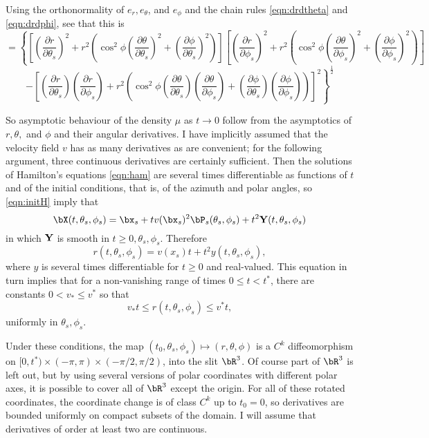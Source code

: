 Using the orthonormality of $e_r, e_{\theta}$, and $e_{\phi}$ and
the chain rules \ref{eqn:drdtheta} and \ref{eqn:drdphi}, see that this is
\[
= \left\{
\left[
\left(\frac{\partial r}{\partial \theta_s}\right)^2 
+
r^2\left(\cos^2 \phi\left(\frac{\partial \theta}{\partial \theta_s}\right)^2 
+
\left(\frac{\partial \phi}{\partial \theta_s}\right)^2\right)\right]
\left[
\left(\frac{\partial r}{\partial \phi_s}\right)^2 
+
r^2\left(\cos^2 \phi\left(\frac{\partial \theta}{\partial \phi_s}\right)^2 
+
\left(\frac{\partial \phi}{\partial \phi_s}\right)^2\right)\right]\right.
\]
\begin{equation}
\label{eqn:mucalc}
\left.-
\left[
\left(\frac{\partial r}{\partial \theta_s}\right) 
\left(\frac{\partial r}{\partial \phi_s}\right)
+
r^2\left(\cos^2 \phi
\left(\frac{\partial \theta}{\partial \theta_s}\right)
\left(\frac{\partial \theta}{\partial \phi_s}\right) 
+
\left(\frac{\partial \phi}{\partial \theta_s}\right) 
\left(\frac{\partial \phi}{\partial \phi_s}\right)
\right)
\right]^2
\right\}^{\frac{1}{2}}
\end{equation}

So asymptotic behaviour of the density $\mu$ as $t
\rightarrow 0$ follow from the asymptotics of $r,\theta,$ and $\phi$
and their angular derivatives.
I have implicitly assumed that the velocity field $v$ has as many
derivatives as are convenient; for the following argument, three
continuous derivatives are certainly sufficient. Then the solutions of
Hamilton's equations \ref{eqn:ham} are several times differentiable as
functions of $t$ and of the initial conditions, that is, of the
azimuth and polar angles, so
\ref{eqn:initH} imply that
\[
\bX(t,\theta_s,\phi_s) = \bx_s + t v(\bx_s)^2\bP_s(\theta_s,\phi_s) + t^2{\bf
  Y}(t,\theta_s,\phi_s)
\]
in which ${\bf Y}$ is smooth in $t \ge 0, \theta_s,\phi_s$. Therefore
\begin{equation}
\label{eqn:rasympt}
r(t,\theta_s,\phi_s) = v(x_s)t + t^2 y(t,\theta_s,\phi_s),
\end{equation}
where $y$ is several times differentiable for $t\ge 0$ and
real-valued. This equation in turn implies that for a non-vanishing
range of times $0 \le t < t^*$, there are constants $0 < v_* \le v^*$
so that
\begin{equation}
\label{eqn:rasgoodast}
v_*t \le r(t,\theta_s,\phi_s) \le v^* t,
\end{equation}
uniformly in $\theta_s,\phi_s$. 

Under these conditions, the map $(t_0,\theta_s,\phi_s) \mapsto
(r,\theta,\phi)$ is a $C^k$ diffeomorphism on $[0,t^*)\times
(-\pi,\pi) \times (-\pi/2,\pi/2)$, into the slit $\bR^3$. Of course
part of $\bR^3$ is left out, but by using several versions of polar
coordinates with different polar axes, it is possible to cover all of
$\bR^3$ except the origin. For all of these rotated coordinates, the
coordinate change is of class $C^k$ up to $t_0=0$, so derivatives are
bounded uniformly on compact subsets of the domain. I will assume that
derivatives of order at least two are continuous.

